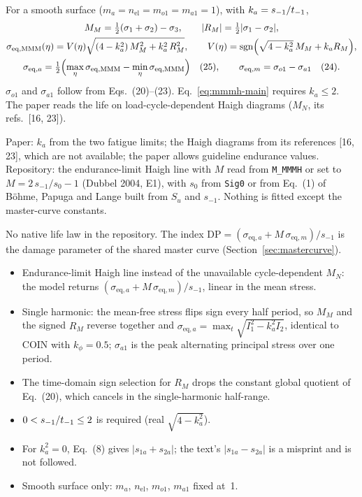  For a smooth surface ($m_a=n_{\mathrm{el}}=m_{o1}=m_{a1}=1$), with $k_a=s_{-1}/t_{-1}$,
\begin{gather}
M_M = \tfrac12(\sigma_1+\sigma_2) - \sigma_3 , \qquad |R_M| = \tfrac12|\sigma_1-\sigma_2| ,
\label{eq:mmmh-circle}\\
\sigma_{\mathrm{eq,MMM}}(\eta) = V(\eta)\sqrt{(4-k_a^2)\,M_M^2 + k_a^2\,R_M^2} , \qquad
V(\eta) = \operatorname{sgn}\Bigl(\sqrt{4-k_a^2}\,M_M + k_a R_M\Bigr) ,
\label{eq:mmmh-main}\\
\sigma_{\mathrm{eq},a} = \tfrac12\Bigl(\max_\eta\sigma_{\mathrm{eq,MMM}} - \min_\eta\sigma_{\mathrm{eq,MMM}}\Bigr) \quad\text{(25)},
\qquad
\sigma_{\mathrm{eq},m} = \sigma_{o1} - \sigma_{a1} \quad\text{(24)} .
\label{eq:mmmh-am}
\end{gather}
$\sigma_{o1}$ and $\sigma_{a1}$ follow from Eqs.~(20)--(23). Eq.~\eqref{eq:mmmh-main} requires
$k_a\le2$. The paper reads the life on load-cycle-dependent Haigh diagrams ($M_N$, its refs.~[16, 23]).

 Paper: $k_a$ from the two fatigue limits; the Haigh diagrams from its
references [16, 23], which are not available; the paper allows guideline endurance values. Repository:
the endurance-limit Haigh line with $M$ read from \texttt{M\_MMMH} or set to $M=2\,s_{-1}/s_0-1$ (Dubbel
2004, E1), with $s_0$ from \texttt{Sig0} or from Eq.~(1) of B\"ohme, Papuga and Lange \cite{bohme2026}
built from $S_u$ and $s_{-1}$. Nothing is fitted except the master-curve constants.

 No native life law in the repository. The index
$\mathrm{DP}=(\sigma_{\mathrm{eq},a}+M\,\sigma_{\mathrm{eq},m})/s_{-1}$ is the damage parameter of the
shared master curve (Section~\ref{sec:mastercurve}).

\begin{itemize}
\item Endurance-limit Haigh line instead of the unavailable cycle-dependent $M_N$: the model returns
  $(\sigma_{\mathrm{eq},a}+M\,\sigma_{\mathrm{eq},m})/s_{-1}$, linear in the mean stress.
\item Single harmonic: the mean-free stress flips sign every half period, so $M_M$ and the signed $R_M$
  reverse together and $\sigma_{\mathrm{eq},a}=\max_t\sqrt{I_1^2-k_a^2I_2}$, identical to COIN with
  $k_\phi=0.5$; $\sigma_{a1}$ is the peak alternating principal stress over one period.
\item The time-domain sign selection for $R_M$ drops the constant global quotient of Eq.~(20), which
  cancels in the single-harmonic half-range.
\item $0<s_{-1}/t_{-1}\le2$ is required (real $\sqrt{4-k_a^2}$).
\item For $k_a^2=0$, Eq.~(8) gives $|s_{1a}+s_{2a}|$; the text's $|s_{1a}-s_{2a}|$ is a misprint and is
  not followed.
\item Smooth surface only: $m_a$, $n_{\mathrm{el}}$, $m_{o1}$, $m_{a1}$ fixed at~1.
\end{itemize}

